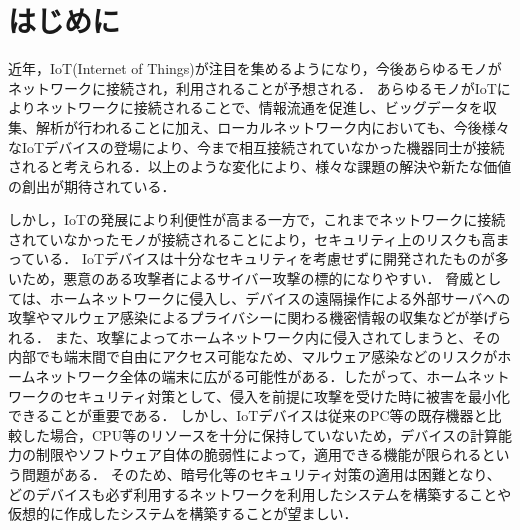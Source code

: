 \documentclass[Japanese]{dicomopapers}
\begin{document}
\section{はじめに}
近年，IoT(Internet of Things)が注目を集めるようになり，今後あらゆるモノがネットワークに接続され，利用されることが予想される．
あらゆるモノがIoTによりネットワークに接続されることで、情報流通を促進し、ビッグデータを収集、解析が行われることに加え、ローカルネットワーク内においても、今後様々なIoTデバイスの登場により、今まで相互接続されていなかった機器同士が接続されると考えられる．以上のような変化により、様々な課題の解決や新たな価値の創出が期待されている．\par
しかし，IoTの発展により利便性が高まる一方で，これまでネットワークに接続されていなかったモノが接続されることにより，セキュリティ上のリスクも高まっている\cite{security}．
IoTデバイスは十分なセキュリティを考慮せずに開発されたものが多いため，悪意のある攻撃者によるサイバー攻撃の標的になりやすい．
脅威としては、ホームネットワークに侵入し、デバイスの遠隔操作による外部サーバへの攻撃やマルウェア感染によるプライバシーに関わる機密情報の収集などが挙げられる．
また、攻撃によってホームネットワーク内に侵入されてしまうと、その内部でも端末間で自由にアクセス可能なため、マルウェア感染などのリスクがホームネットワーク全体の端末に広がる可能性がある．したがって、ホームネットワークのセキュリティ対策として、侵入を前提に攻撃を受けた時に被害を最小化できることが重要である．
しかし、IoTデバイスは従来のPC等の既存機器と比較した場合，CPU等のリソースを十分に保持していないため，デバイスの計算能力の制限やソフトウェア自体の脆弱性によって，適用できる機能が限られるという問題がある．
そのため、暗号化等のセキュリティ対策の適用は困難となり、どのデバイスも必ず利用するネットワークを利用したシステムを構築することや仮想的に作成したシステムを構築することが望ましい．\par
\end{document}
